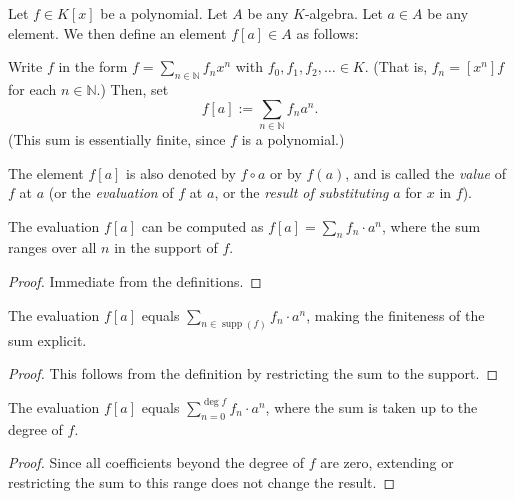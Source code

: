 \begin{definition}
\label{def.pol.subs}
\leantarget
\leanok
Let $f\in K\left[  x\right]  $ be a polynomial. Let $A$ be
any $K$-algebra. Let $a\in A$ be any element. We then define an element
$f\left[  a\right]  \in A$ as follows:

Write $f$ in the form $f=\sum_{n\in\mathbb{N}}f_{n}x^{n}$ with $f_{0}%
,f_{1},f_{2},\ldots\in K$. (That is, $f_{n}=\left[  x^{n}\right]  f$ for each
$n\in\mathbb{N}$.) Then, set%
\[
f\left[  a\right]  :=\sum_{n\in\mathbb{N}}f_{n}a^{n}.
\]
(This sum is essentially finite, since $f$ is a polynomial.)

The element $f\left[  a\right]  $ is also denoted by $f\circ a$ or by
$f\left(  a\right)  $, and is called the \emph{value} of $f$ at $a$ (or the
\emph{evaluation} of $f$ at $a$, or the \emph{result of substituting }$a$ for
$x$ in $f$).
\end{definition}

\begin{lemma}
\label{lem.pol.eval.def}
\leanhelper
\leanok
The evaluation $f\left[a\right]$ can be computed as
$f\left[a\right]=\sum_{n}f_{n}\cdot a^{n}$,
where the sum ranges over all $n$ in the support of $f$.
\end{lemma}

\begin{proof}
\leanok
Immediate from the definitions.
\end{proof}

\begin{lemma}
\label{lem.pol.eval.finsum}
\leanhelper
\leanok
The evaluation $f\left[a\right]$ equals
$\sum_{n\in\operatorname{supp}(f)}f_{n}\cdot a^{n}$,
making the finiteness of the sum explicit.
\end{lemma}

\begin{proof}
\leanok
This follows from the definition by restricting the sum to the support.
\end{proof}

\begin{lemma}
\label{lem.pol.eval.sum-range}
\leanhelper
\leanok
The evaluation $f\left[a\right]$ equals
$\sum_{n=0}^{\deg f}f_{n}\cdot a^{n}$,
where the sum is taken up to the degree of $f$.
\end{lemma}

\begin{proof}
\leanok
Since all coefficients beyond the degree of $f$ are zero, extending or
restricting the sum to this range does not change the result.
\end{proof}

